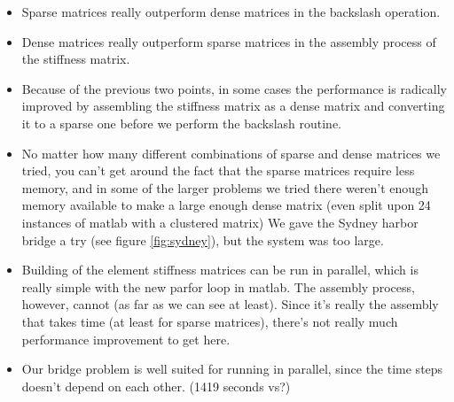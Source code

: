 \begin{itemize}
\item Sparse matrices really outperform dense matrices in the backslash operation.
\item Dense matrices really outperform sparse matrices in the assembly process of the stiffness matrix.
\item Because of the previous two points, in some cases the performance is radically improved by assembling the stiffness matrix as a dense matrix and converting it to a sparse one before we perform the backslash routine.
\item No matter how many different combinations of sparse and dense matrices we tried, you can't get around the fact that the sparse matrices require less memory, and in some of the larger problems we tried there weren't enough memory available to make a large enough dense matrix (even split upon 24 instances of matlab with a clustered matrix) We gave the Sydney harbor bridge a try (see figure \ref{fig:sydney}), but the system was too large.
\item Building of the element stiffness matrices can be run in parallel, which is really simple with the new parfor loop in matlab. The assembly process, however, cannot (as far as we can see at least). Since it's really the assembly that takes time (at least for sparse matrices), there's not really much performance improvement to get here.
\item Our bridge problem is well suited for running in parallel, since the time steps doesn’t depend on each other. (1419 seconds vs?)
\end{itemize}
